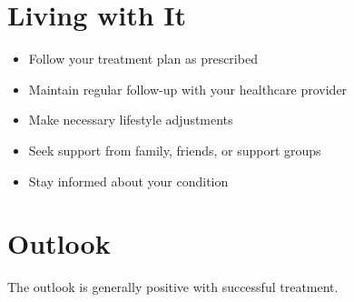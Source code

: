 \section{Living with It}
\begin{itemize}[noitemsep]
  \item Follow your treatment plan as prescribed
  \item Maintain regular follow-up with your healthcare provider
  \item Make necessary lifestyle adjustments
  \item Seek support from family, friends, or support groups
  \item Stay informed about your condition
\end{itemize}
\section{Outlook}
The outlook is generally positive with successful treatment.
